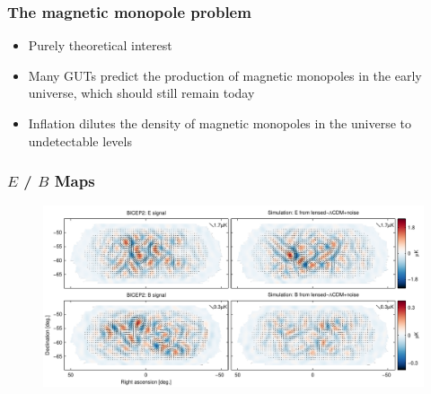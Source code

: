 \documentclass[]{beamer}
\begin{document}
\begin{frame}
  \frametitle{The magnetic monopole problem}
  \begin{itemize}
  \item Purely theoretical interest

  \item Many GUTs predict the production of magnetic monopoles in the
    early universe, which should still remain today

  \item Inflation dilutes the density of magnetic monopoles in the
    universe to undetectable levels

  \end{itemize}
\end{frame}


\begin{frame}
  \frametitle{$E$ / $B$ Maps}
  \begin{figure}
    \centering
    \includegraphics[width=\columnwidth]{eb_maps}
  \end{figure}
\end{frame}
\end{document}
